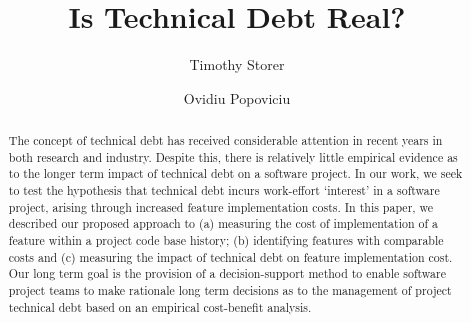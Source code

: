 \documentclass[sigconf]{acmart}
\begin{document}
\title{Is Technical Debt Real?}


\author{Timothy Storer}
\email{}

\author{Ovidiu Popoviciu}
\email{}




\begin{abstract}
The concept of technical debt has received considerable attention in 
recent years in both research and industry.  Despite this, there is 
relatively little empirical evidence as to the longer term impact of 
technical debt on a software project.  In our work, we seek to test the 
hypothesis that technical debt incurs work-effort `interest' in a 
software project, arising through increased feature implementation 
costs.  In this paper, we described our proposed approach to (a) 
measuring the cost of implementation of a feature within a project code 
base history; (b) identifying features with comparable costs and (c) 
measuring the impact of technical debt on feature implementation cost.  
Our long term goal is the provision of a decision-support method to enable 
software project teams to make rationale long term decisions as to the 
management of project technical debt based on an empirical cost-benefit 
analysis.
\end{abstract}

%
%
\end{document}
